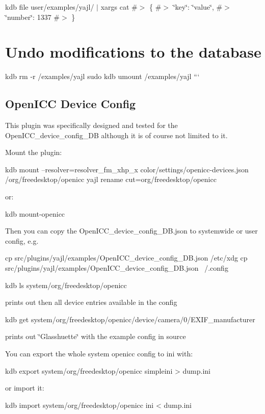 kdb file user/examples/yajl/ $\vert$ xargs cat \#$>$ \{ \#$>$ \char`\"{}key\char`\"{}\+: \char`\"{}value\char`\"{}, \#$>$ \char`\"{}number\char`\"{}\+: 1337 \#$>$ \}

\section*{Undo modifications to the database}

kdb rm -\/r /examples/yajl sudo kdb umount /examples/yajl ```

\subsection*{Open\+I\+CC Device Config}

This plugin was specifically designed and tested for the {\ttfamily Open\+I\+C\+C\+\_\+device\+\_\+config\+\_\+\+DB} although it is of course not limited to it.

Mount the plugin\+: \begin{DoxyVerb}kdb mount --resolver=resolver_fm_xhp_x color/settings/openicc-devices.json /org/freedesktop/openicc yajl rename cut=org/freedesktop/openicc
\end{DoxyVerb}


or\+: \begin{DoxyVerb}kdb mount-openicc
\end{DoxyVerb}


Then you can copy the Open\+I\+C\+C\+\_\+device\+\_\+config\+\_\+\+D\+B.\+json to systemwide or user config, e.\+g. \begin{DoxyVerb}cp src/plugins/yajl/examples/OpenICC_device_config_DB.json /etc/xdg
cp src/plugins/yajl/examples/OpenICC_device_config_DB.json ~/.config

kdb ls system/org/freedesktop/openicc
\end{DoxyVerb}


prints out then all device entries available in the config \begin{DoxyVerb}kdb get system/org/freedesktop/openicc/device/camera/0/EXIF_manufacturer
\end{DoxyVerb}


prints out \char`\"{}\+Glasshuette\char`\"{} with the example config in source

You can export the whole system openicc config to ini with\+: \begin{DoxyVerb}kdb export system/org/freedesktop/openicc simpleini > dump.ini
\end{DoxyVerb}


or import it\+: \begin{DoxyVerb}kdb import system/org/freedesktop/openicc ini < dump.ini\end{DoxyVerb}
 
